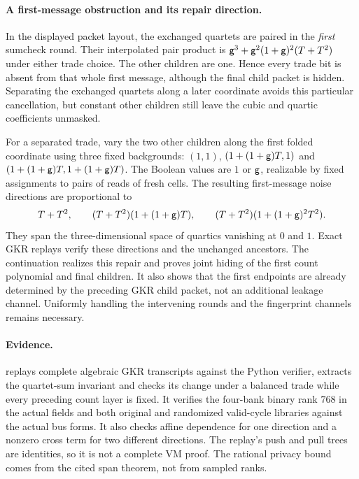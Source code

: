 \documentclass[11pt]{article}
\begin{document}
\paragraph{A first-message obstruction and its repair direction.} In the displayed packet layout, the exchanged quartets are paired in the \emph{first} sumcheck round. Their interpolated pair product is $\mathsf{g}^3+\mathsf{g}^2(1+\mathsf{g})^2(T+T^2)$ under either trade choice. The other children are one. Hence every trade bit is absent from that whole first message, although the final child packet is hidden. Separating the exchanged quartets along a later coordinate avoids this particular cancellation, but constant other children still leave the cubic and quartic coefficients unmasked.

For a separated trade, vary the two other children along the first folded coordinate using three fixed backgrounds: $(1,1)$, $(1+(1+\mathsf{g})T,1)$ and $(1+(1+\mathsf{g})T,1+(1+\mathsf{g})T)$. The Boolean values are $1$ or $\mathsf{g}$, realizable by fixed assignments to pairs of reads of fresh cells. The resulting first-message noise directions are proportional to
\[
 T+T^2,\qquad
 (T+T^2)(1+(1+\mathsf{g})T),\qquad
 (T+T^2)(1+(1+\mathsf{g})^2T^2).
\]
They span the three-dimensional space of quartics vanishing at $0$ and $1$. Exact GKR replays verify these directions and the unchanged ancestors. The continuation  realizes this repair and proves joint hiding of the first count polynomial and final children. It also shows that the first endpoints are already determined by the preceding GKR child packet, not an additional leakage channel. Uniformly handling the intervening rounds and the fingerprint channels remains necessary.

\paragraph{Evidence.}  replays complete algebraic GKR transcripts against the Python verifier, extracts the quartet-sum invariant and checks its change under a balanced trade while every preceding count layer is fixed. It verifies the four-bank binary rank $768$ in the actual fields and both original and randomized valid-cycle libraries against the actual bus forms. It also checks affine dependence for one direction and a nonzero cross term for two different directions. The replay's push and pull trees are identities, so it is not a complete VM proof. The rational privacy bound comes from the cited span theorem, not from sampled ranks.
\end{document}

